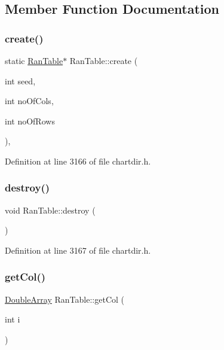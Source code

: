 \subsection{Member Function Documentation}
\mbox{\label{class_ran_table_a19c9e0d90c39fa3e4b88e21d74622186}} 
\subsubsection{\texorpdfstring{create()}{create()}}
{\footnotesize\ttfamily static \hyperlink{class_ran_table}{Ran\+Table}$\ast$ Ran\+Table\+::create (\begin{DoxyParamCaption}\item[{int}]{seed,  }\item[{int}]{no\+Of\+Cols,  }\item[{int}]{no\+Of\+Rows }\end{DoxyParamCaption})\hspace{0.3cm}{\ttfamily [inline]}, {\ttfamily [static]}}



Definition at line 3166 of file chartdir.\+h.

\mbox{\label{class_ran_table_a221cd11c0733ba1cd5130b6dc7367cb0}} 
\subsubsection{\texorpdfstring{destroy()}{destroy()}}
{\footnotesize\ttfamily void Ran\+Table\+::destroy (\begin{DoxyParamCaption}{ }\end{DoxyParamCaption})\hspace{0.3cm}{\ttfamily [inline]}}



Definition at line 3167 of file chartdir.\+h.

\mbox{\label{class_ran_table_a98c2e1df04ab232b51c6f089a411f99f}} 
\subsubsection{\texorpdfstring{get\+Col()}{getCol()}}
{\footnotesize\ttfamily \hyperlink{class_double_array}{Double\+Array} Ran\+Table\+::get\+Col (\begin{DoxyParamCaption}\item[{int}]{i }\end{DoxyParamCaption})\hspace{0.3cm}{\ttfamily [inline]}}



